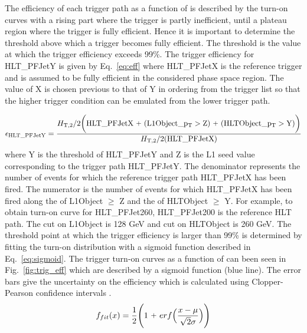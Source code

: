 The efficiency of each trigger path as a function of \httwo is described by the turn-on curves with a rising part where the trigger is partly inefficient, until a plateau region where the trigger is fully efficient. Hence it is important to determine the threshold above which a trigger becomes fully efficient. The threshold is the value at which the trigger efficiency exceeds 99\%. The trigger efficiency for HLT\_PFJetY is given by Eq.~\ref{eq:eff} where HLT\_PFJetX is the reference trigger and is assumed to be fully efficient in the considered phase space region. The value of X is chosen previous to that of Y in \pt ordering from the trigger list so that the higher trigger condition can be emulated from the lower trigger path.

\begin{equation}
 \label{eq:eff}
 {\rm \epsilon_{HLT\_PFJetY}} = \frac{\httwo {\rm \bigg(HLT\_PFJetX~\plus (L1Object\_\pt > Z)~\plus (HLTObject\_\pt > Y)\bigg)}}{\httwo {\rm (HLT\_PFJetX)}}
\end{equation}
where Y is the \pt threshold of HLT\_PFJetY and Z is the L1 seed value corresponding to the trigger path HLT\_PFJetY. The denominator represents the number of events for which the reference trigger path HLT\_PFJetX has been fired. The numerator is the number of events for which HLT\_PFJetX has been fired along the \pt of L1Object $\geq$ Z and the \pt of HLTObject $\geq$ Y. For example, to obtain turn-on curve for HLT\_PFJet260, HLT\_PFJet200 is the reference HLT path. The \pt cut on L1Object is 128 GeV and \pt cut on HLTObject is 260 GeV. The threshold point at which the trigger efficiency is larger than 99\% is determined by fitting the turn-on distribution with a sigmoid function described in Eq.~\ref{eq:sigmoid}. The trigger turn-on curves as a function of \httwo can been seen in Fig.~\ref{fig:trig_eff} which are described by a sigmoid function (blue line). The error bars give the uncertainty on the efficiency which is calculated using Clopper-Pearson confidence intervals \cite{10.2307/2331986}.
\begin{equation}
 \label{eq:sigmoid}
  f_{fit} (x) = \frac {1}{2} \Bigg( 1 ~\plusn~ erf \Big(\frac {x - \mu}{\sqrt{2} \sigma} \Big) \Bigg)
\end{equation}

